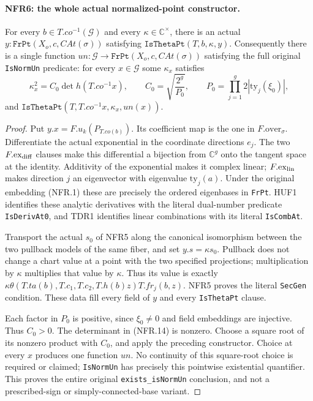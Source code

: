 \paragraph{NFR6: the whole actual normalized-point constructor.}
\label{claim:NFR6}
For every $b\in T.co^{-1}(\mathcal G)$ and every
$\kappa\in\mathbb C^\times$, there is an actual
$y:\texttt{FrPt}(X_o,c,CAt(\sigma))$ satisfying
$\texttt{IsThetaPt}(T,b,\kappa,y)$.
Consequently there is a single function
$un:\mathcal G\to\texttt{FrPt}(X_o,c,CAt(\sigma))$
satisfying the full original \texttt{IsNormUn} predicate:
for every $x\in\mathcal G$ some $\kappa_x$ satisfies
\[
 \kappa_x^2=C_0\det h(T.co^{-1}x),\qquad
 C_0=\sqrt{\frac{2^g}{P_0}},\qquad
 P_0=\prod_{j=1}^g2|\mathrm{ty}_j(\xi_0)|,
 \tag{NFR.14}
\]
and $\texttt{IsThetaPt}(T,T.co^{-1}x,\kappa_x,un(x))$.

\begin{proof}
Put $y.x=F.u_k(P_{T.co(b)})$.  Its coefficient map is the one in
$F.\mathrm{over}_\sigma$.  Differentiate the actual exponential
in the coordinate directions $e_j$.  The two $F.\mathrm{ex}_{\rm diff}$
clauses make this differential a bijection from $\mathbb C^g$
onto the tangent space at the identity.  Additivity of the
exponential makes it complex linear; $F.\mathrm{ex}_{\rm lin}$
makes direction $j$ an eigenvector with eigenvalue
$\mathrm{ty}_j(a)$.  Under the original embedding (NFR.1) these
are precisely the ordered eigenbases in \texttt{FrPt}.
HUF1 identifies these analytic derivatives with the literal
dual-number predicate \texttt{IsDerivAt0}, and TDR1 identifies
linear combinations with its literal \texttt{IsCombAt}.

Transport the actual $s_0$ of NFR5 along the canonical isomorphism
between the two pullback models of the same fiber, and set
$y.s=\kappa s_0$.  Pullback does not change a chart value at a
point with the two specified projections; multiplication by
$\kappa$ multiplies that value by $\kappa$.
Thus its value is exactly
$\kappa\theta(T.ta(b),T.c_1,T.c_2,T.h(b)z)T.fr_j(b,z)$.
NFR5 proves the literal \texttt{SecGen} condition.  These data
fill every field of $y$ and every \texttt{IsThetaPt} clause.

Each factor in $P_0$ is positive, since $\xi_0\ne0$ and field
embeddings are injective.  Thus $C_0>0$.  The determinant in
(NFR.14) is nonzero.  Choose a square root of its nonzero
product with $C_0$, and apply the preceding constructor.
Choice at every $x$ produces one function $un$.
No continuity of this square-root choice is required or claimed;
\texttt{IsNormUn} has precisely this pointwise existential
quantifier.  This proves the entire original
\texttt{exists\_isNormUn} conclusion, and not a prescribed-sign
or simply-connected-base variant.
\end{proof}

